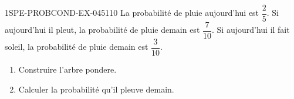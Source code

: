 \begin{exercice}{1SPE-PROBCOND-EX-045}{1}{10}
La probabilité de pluie aujourd'hui est $\dfrac{2}{5}$. Si aujourd'hui il pleut, la probabilité de pluie demain est $\dfrac{7}{10}$. Si aujourd'hui il fait soleil, la probabilité de pluie demain est $\dfrac{3}{10}$.

\begin{enumerate}
  \item Construire l'arbre pondere.
  \item Calculer la probabilité qu'il pleuve demain.
\end{enumerate}
\end{exercice}
